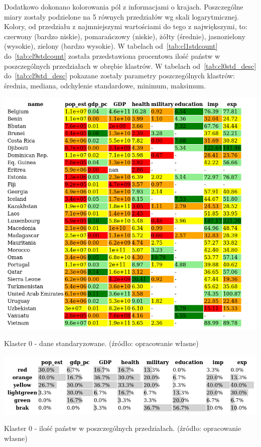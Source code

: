 \documentclass[11pt]{report}
\begin{document}
    Dodatkowo dokonano kolorowania pól z informacjami o krajach.
    Poszczególne miary zostały podzielone na 5 równych przedziałów wg skali logarytmicznej.
    Kolory, od przedziału z najmniejszymi wartościami do tego z największymi, to: czerwony (bardzo niskie), pomarańczowy (niskie), żółty (średnie), jasnozielony (wysokie), zielony (bardzo wysokie).
    W tabelach od~\ref{tab:cl1stdcount} do~\ref{tab:cl9stdcount} została przedstawiona procentowa ilość państw w poszczególnych przedziałach w obrębie klastrów.
    W tabelach od~\ref{tab:cl0std_desc} do~\ref{tab:cl9std_desc} pokazane zostały parametry poszczególnych klastrów: średnia, mediana, odchylenie standardowe, minimum, maksimum.


    \begin{table}[!htp]
        \centering
        \includegraphics[width=\linewidth]{tables/CLUST/cluster0stdkmeans.png}
        \caption{Klaster 0 - dane standaryzowane. (źródło: opracowanie własne)}
        \label{tab:cl0std}
    \end{table}

    \begin{table}[!htp]
        \centering
        \includegraphics[width=\linewidth]{tables/CLUST/cluster0stdkmeanscount.png}
        \caption{Klaster 0 - ilość państw w poszczególnych przedziałach. (źródło: opracowanie własne)}
        \label{tab:cl0stdcount}
    \end{table}
\end{document}
